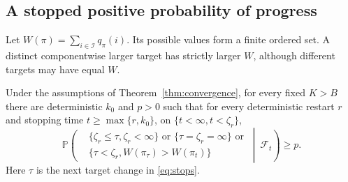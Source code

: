 \subsection{A stopped positive probability of progress}
Let $W(\pi)=\sum_{i\in\mathcal I}q_\pi(i)$. Its possible values form a finite ordered set. A distinct componentwise larger target has strictly larger $W$, although different targets may have equal
$W$.

\begin{lemma}\label{lem:progress}
Under the assumptions of Theorem~\ref{thm:convergence}, for
every fixed $K>B$ there are deterministic $k_0$ and $p>0$ such that for every deterministic
restart $r$ and stopping time $t\ge\max\{r,k_0\}$, on $\{t<\infty,t<\zeta_r\}$,
\begin{equation}\label{eq:progress}
\mathbb P\!\left(
\begin{aligned}
&\{\zeta_r\le\tau,\zeta_r<\infty\}\text{ or }\{\tau=\zeta_r=\infty\}\text{ or}\\
&\{\tau<\zeta_r,W(\pi_\tau)>W(\pi_t)\}
\end{aligned}
\ \middle|\ \mathcal F_t\right)\ge p.
\end{equation}
Here $\tau$ is the next target change in \eqref{eq:stops}.
\end{lemma}
